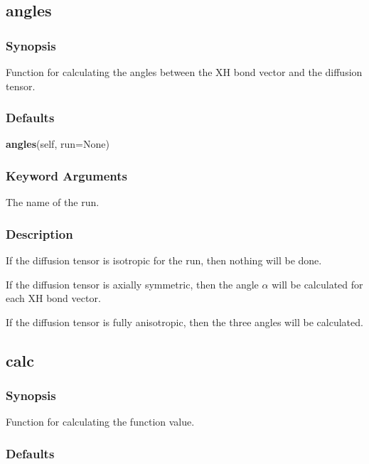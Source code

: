 

\newpage

\subsection{angles}


\subsubsection{Synopsis}

Function for calculating the angles between the XH bond vector and the diffusion tensor.

\subsubsection{Defaults}

\textsf{\textbf{angles}(self, run=None)}


\subsubsection{Keyword Arguments}


  The name of the run.

\subsubsection{Description}

If the diffusion tensor is isotropic for the run, then nothing will be done.

If the diffusion tensor is axially symmetric, then the angle $\alpha$ will be calculated for
each XH bond vector.

If the diffusion tensor is fully anisotropic, then the three angles will be calculated.


\newpage

\subsection{calc}


\subsubsection{Synopsis}

Function for calculating the function value.

\subsubsection{Defaults}

